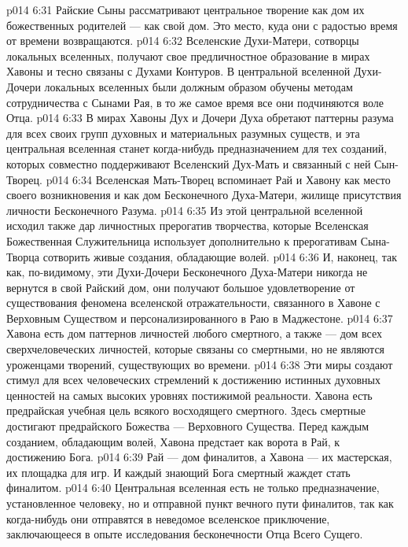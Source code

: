 \vs p014 6:31 Райские Сыны рассматривают центральное творение как дом их божественных родителей --- как свой дом. Это место, куда они с радостью время от времени возвращаются.
\vs p014 6:32 \bibnobreakspace {} Вселенские Духи\hyp{}Матери, сотворцы локальных вселенных, получают свое предличностное образование в мирах Хавоны и тесно связаны с Духами Контуров. В центральной вселенной Духи\hyp{}Дочери локальных вселенных были должным образом обучены методам сотрудничества с Сынами Рая, в то же самое время все они подчиняются воле Отца.
\vs p014 6:33 В мирах Хавоны Дух и Дочери Духа обретают паттерны разума для всех своих групп духовных и материальных разумных существ, и эта центральная вселенная станет когда\hyp{}нибудь предназначением для тех созданий, которых совместно поддерживают Вселенский Дух\hyp{}Мать и связанный с ней Сын\hyp{}Творец.
\vs p014 6:34 Вселенская Мать\hyp{}Творец вспоминает Рай и Хавону как место своего возникновения и как дом Бесконечного Духа\hyp{}Матери, жилище присутствия личности Бесконечного Разума.
\vs p014 6:35 Из этой центральной вселенной исходил также дар личностных прерогатив творчества, которые Вселенская Божественная Служительница использует дополнительно к прерогативам Сына\hyp{}Творца сотворить живые создания, обладающие волей.
\vs p014 6:36 И, наконец, так как, по\hyp{}видимому, эти Духи\hyp{}Дочери Бесконечного Духа\hyp{}Матери никогда не вернутся в свой Райский дом, они получают большое удовлетворение от существования феномена вселенской отражательности, связанного в Хавоне с Верховным Существом и персонализированного в Раю в Маджестоне.
\vs p014 6:37 \bibnobreakspace {} Хавона есть дом паттернов личностей любого смертного, а также --- дом всех сверхчеловеческих личностей, которые связаны со смертными, но не являются уроженцами творений, существующих во времени.
\vs p014 6:38 Эти миры создают стимул для всех человеческих стремлений к достижению истинных духовных ценностей на самых высоких уровнях постижимой реальности. Хавона есть предрайская учебная цель всякого восходящего смертного. Здесь смертные достигают предрайского Божества --- Верховного Существа. Перед каждым созданием, обладающим волей, Хавона предстает как ворота в Рай, к достижению Бога.
\vs p014 6:39 Рай --- дом финалитов, а Хавона --- их мастерская, их площадка для игр. И каждый знающий Бога смертный жаждет стать финалитом.
\vs p014 6:40 Центральная вселенная есть не только предназначение, установленное человеку, но и отправной пункт вечного пути финалитов, так как когда\hyp{}нибудь они отправятся в неведомое вселенское приключение, заключающееся в опыте исследования бесконечности Отца Всего Сущего.
